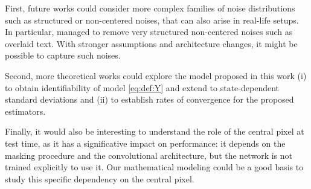 \documentclass[lettersize,journal]{IEEEtran}
\begin{document}
First, future works could consider more complex families of noise distributions such as structured or non-centered noises, that can also arise in real-life setups. In particular, \cite{lehtinen2018noise2noise} managed to remove very structured non-centered noises such as overlaid text. With stronger assumptions and architecture changes, it might be possible to capture such noises.

Second, more theoretical works could explore the model proposed in this work  (i) to obtain identifiability of model \eqref{eq:def:Y} and extend \cite{gassiat:lecorff:lehericy:2021} to state-dependent standard deviations and (ii) to establish rates of convergence for the proposed estimators.

Finally, it would also be interesting to understand the role of the central pixel at test time, as it has a significative impact on performance: it depends on the masking procedure and the convolutional architecture, but the network is not trained explicitly to use it. Our mathematical modeling could be a good basis to study this specific dependency on the central pixel.





%
%

\end{document}
